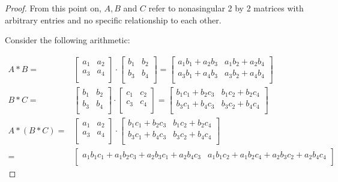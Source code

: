 \documentclass[12pt]{article}
\begin{document}
\begin{proof}
From this point on, $A, B$ and $C$ refer to nonasingular 2 by 2 matrices with arbitrary entries and no specific relationship to each other.

Consider the following arithmetic:


\begin{align}
	\label{eq:matrix3}
	A * B = &
	\begin{bmatrix} a_1 & a_2 \\ a_3 & a_4 \\ \end{bmatrix}
	\cdot
	\begin{bmatrix} b_1 & b_2 \\ b_3 & b_4 \\ \end{bmatrix}
	=
	\begin{bmatrix} a_1 b_1 + a_2 b_3 & a_1 b_2 + a_2 b_4 \\ a_3 b_1 + a_4 b_3 & a_3 b_2 + a_4 b_4 \\ \end{bmatrix}
	\\ \label{eq:matrix4}
	B * C = &
	\begin{bmatrix} b_1 & b_2 \\ b_3 & b_4 \\ \end{bmatrix}
	\cdot
	\begin{bmatrix} c_1 & c_2 \\ c_3 & c_4 \\ \end{bmatrix}
	=
	\begin{bmatrix} b_1 c_1 + b_2 c_3 & b_1 c_2 + b_2 c_4 \\ b_3 c_1 + b_4 c_3 & b_3 c_2 + b_4 c_4 \\ \end{bmatrix}
	\\ \label{eq:matrix5}
	A * (B * C) = &
	\begin{bmatrix} a_1 & a_2 \\ a_3 & a_4 \\ \end{bmatrix}
	\cdot
	\begin{bmatrix} b_1 c_1 + b_2 c_3 & b_1 c_2 + b_2 c_4 \\ b_3 c_1 + b_4 c_3 & b_3 c_2 + b_4 c_4 \\ \end{bmatrix}
	\\ = & 
	\begin{bmatrix}
		a_1 b_1 c_1 + a_1 b_2 c_3 + a_2 b_3 c_1 + a_2 b_4 c_3 &
		a_1 b_1 c_2 + a_1 b_2 c_4 + a_2 b_3 c_2 + a_2 b_4 c_4 \\

\end{bmatrix}
\end{align}
\end{proof}
\end{document}
